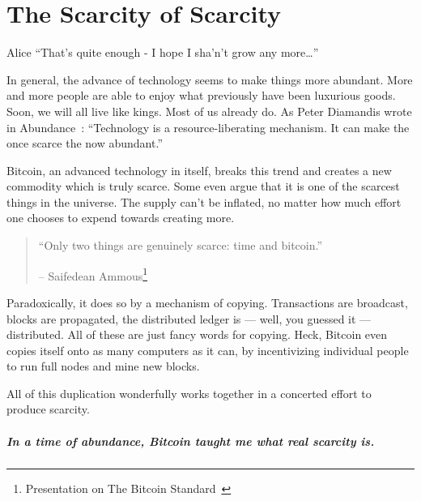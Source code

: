 
\chapter{The Scarcity of Scarcity}
\label{les:2}

\begin{chapquote}{Alice}
\enquote{That's quite enough - I hope I sha'n't grow any more\ldots}
\end{chapquote}

In general, the advance of technology seems to make things more abundant. More
and more people are able to enjoy what previously have been luxurious goods.
Soon, we will all live like kings. Most of us already do. As Peter Diamandis
wrote in Abundance~\cite{abundance}: \enquote{Technology is a resource-liberating
mechanism. It can make the once scarce the now abundant.}

Bitcoin, an advanced technology in itself, breaks this trend and creates
a new commodity which is truly scarce. Some even argue that it is one of
the scarcest things in the universe. The supply can't be inflated, no
matter how much effort one chooses to expend towards creating more.

\begin{quotation}\begin{samepage}
\enquote{Only two things are genuinely scarce: time and bitcoin.}
\begin{flushright} -- Saifedean Ammous\footnote{Presentation on The Bitcoin Standard~\cite{bitcoinstandard-pres}}
\end{flushright}\end{samepage}\end{quotation}

Paradoxically, it does so by a mechanism of copying. Transactions are
broadcast, blocks are propagated, the distributed ledger is --- well,
you guessed it --- distributed. All of these are just fancy words for
copying. Heck, Bitcoin even copies itself onto as many computers as it
can, by incentivizing individual people to run full nodes and mine new
blocks.

All of this duplication wonderfully works together in a concerted effort
to produce scarcity.

\paragraph{In a time of abundance, Bitcoin taught me what real scarcity is.}

